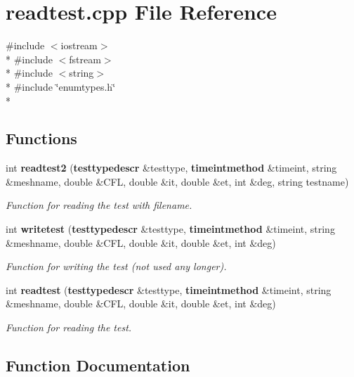 \section{readtest.\-cpp File Reference}
\label{readtest_8cpp}
{\ttfamily \#include $<$iostream$>$}\\*
{\ttfamily \#include $<$fstream$>$}\\*
{\ttfamily \#include $<$string$>$}\\*
{\ttfamily \#include \char`\"{}enumtypes.\-h\char`\"{}}\\*
\subsection*{Functions}
\begin{DoxyCompactItemize}
\item 
int {\bf readtest2} ({\bf testtypedescr} \&testtype, {\bf timeintmethod} \&timeint, string \&meshname, double \&C\-F\-L, double \&it, double \&et, int \&deg, string testname)
\begin{DoxyCompactList}\small\item\em Function for reading the test with filename. \end{DoxyCompactList}\item 
int {\bf writetest} ({\bf testtypedescr} \&testtype, {\bf timeintmethod} \&timeint, string \&meshname, double \&C\-F\-L, double \&it, double \&et, int \&deg)
\begin{DoxyCompactList}\small\item\em Function for writing the test (not used any longer). \end{DoxyCompactList}\item 
int {\bf readtest} ({\bf testtypedescr} \&testtype, {\bf timeintmethod} \&timeint, string \&meshname, double \&C\-F\-L, double \&it, double \&et, int \&deg)
\begin{DoxyCompactList}\small\item\em Function for reading the test. \end{DoxyCompactList}\end{DoxyCompactItemize}


\subsection{Function Documentation}
